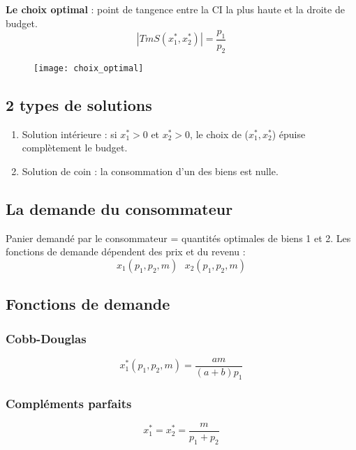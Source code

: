 \textbf{Le choix optimal} : point de tangence entre la CI la plus haute et la droite de budget.
\begin{equation*}
|TmS(x^*_1,x^*_2)| = \frac{p_1}{p_2}
\end{equation*}
\begin{figure}[H]
	\centering
	\texttt{[image: choix\_optimal]}
\end{figure}

\subsection{2 types de solutions}

\begin{enumerate}
\item Solution intérieure : si $x^*_1 > 0$ et $x^*_2 > 0$, le choix de ($x^*_1,x^*_2$) épuise complètement le budget.
\item Solution de coin : la consommation d'un des biens est nulle.
\end{enumerate}

\subsection{La demande du consommateur}

Panier demandé par le consommateur = quantités optimales de biens 1 et 2. Les fonctions de demande dépendent des prix et du revenu :
\begin{equation*}
x_1(p_1,p_2,m) \text{ } x_2(p_1,p_2,m)
\end{equation*}

\subsection{Fonctions de demande}

\subsubsection{Cobb-Douglas}
\begin{equation*}
x^*_1(p_1,p_2,m) = \frac{am}{(a+b)p_1}
\end{equation*}

\subsubsection{Compléments parfaits}
\begin{equation*}
x^*_1 = x^*_2 = \frac{m}{p_1+p_2}
\end{equation*}

